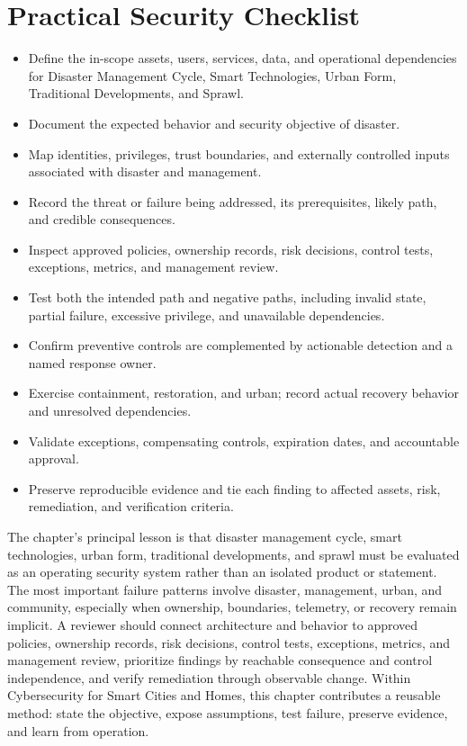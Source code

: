 \documentclass[11pt]{article}
\begin{document}
\section*{Practical Security Checklist}
\begin{itemize}[label=$\square$]
\item Define the in-scope assets, users, services, data, and operational dependencies for Disaster Management Cycle, Smart Technologies, Urban Form, Traditional Developments, and Sprawl.
\item Document the expected behavior and security objective of disaster.
\item Map identities, privileges, trust boundaries, and externally controlled inputs associated with disaster and management.
\item Record the threat or failure being addressed, its prerequisites, likely path, and credible consequences.
\item Inspect approved policies, ownership records, risk decisions, control tests, exceptions, metrics, and management review.
\item Test both the intended path and negative paths, including invalid state, partial failure, excessive privilege, and unavailable dependencies.
\item Confirm preventive controls are complemented by actionable detection and a named response owner.
\item Exercise containment, restoration, and urban; record actual recovery behavior and unresolved dependencies.
\item Validate exceptions, compensating controls, expiration dates, and accountable approval.
\item Preserve reproducible evidence and tie each finding to affected assets, risk, remediation, and verification criteria.
\end{itemize}
\begin{synthesisbox}
The chapter's principal lesson is that disaster management cycle, smart technologies, urban form, traditional developments, and sprawl must be evaluated as an operating security system rather than an isolated product or statement. The most important failure patterns involve disaster, management, urban, and community, especially when ownership, boundaries, telemetry, or recovery remain implicit. A reviewer should connect architecture and behavior to approved policies, ownership records, risk decisions, control tests, exceptions, metrics, and management review, prioritize findings by reachable consequence and control independence, and verify remediation through observable change. Within Cybersecurity for Smart Cities and Homes, this chapter contributes a reusable method: state the objective, expose assumptions, test failure, preserve evidence, and learn from operation.
\end{synthesisbox}
\end{document}

